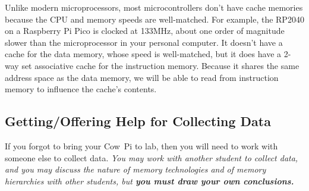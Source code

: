 Unlike modern microprocessors, most microcontrollers don't have cache
memories because the CPU and memory speeds are well-matched.
For example, the RP2040 on a Raspberry Pi Pico is clocked at 133MHz, about one order of magnitude slower than the microprocessor in your personal computer.
It doesn't have a cache for the data memory, whose speed is well-matched,
but it does have a 2-way set associative cache for the instruction memory.
Because it shares the same address space as the data memory, we will be able to read from instruction memory to influence the cache's contents.

%


\subsection{Getting/Offering Help for Collecting Data}

If you forgot to bring your Cow~Pi to lab, %
then you will need to work with someone else to collect data.
\textit{You may work with another student to collect data, and you may discuss the nature of memory technologies and of memory hierarchies with other students, but \textbf{you must draw your own conclusions.}}

